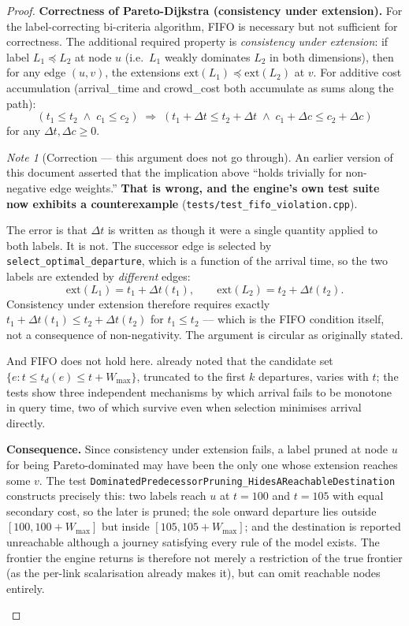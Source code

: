 \documentclass[11pt, a4paper]{article}
\theoremstyle{remark}
\newtheorem*{note}{Note}
\newcommand{\wmax}{W_{\max}}
\begin{document}
\begin{proof}
    \textbf{Correctness of Pareto-Dijkstra (consistency under extension).}
    For the label-correcting bi-criteria algorithm, FIFO is necessary but not
    sufficient for correctness. The additional required property is
    \emph{consistency under extension}: if label $L_1 \preceq L_2$ at node $u$
    (i.e.\ $L_1$ weakly dominates $L_2$ in both dimensions), then for any edge
    $(u,v)$, the extensions $\mathrm{ext}(L_1) \preceq \mathrm{ext}(L_2)$ at
    $v$. For additive cost accumulation (arrival\_time and crowd\_cost both
    accumulate as sums along the path):
    \[
        (t_1 \le t_2 \;\wedge\; c_1 \le c_2)
        \;\Rightarrow\;
        (t_1 + \Delta t \le t_2 + \Delta t \;\wedge\; c_1 + \Delta c \le c_2 + \Delta c)
    \]
    for any $\Delta t, \Delta c \ge 0$.

    \begin{note}[Correction --- this argument does not go through]
    \label{note:extension-gap}
    An earlier version of this document asserted that the implication above
    ``holds trivially for non-negative edge weights.'' \textbf{That is wrong, and
    the engine's own test suite now exhibits a counterexample}
    (\texttt{tests/test\_fifo\_violation.cpp}).

    The error is that $\Delta t$ is written as though it were a single quantity
    applied to both labels. It is not. The successor edge is selected by
    \texttt{select\_optimal\_departure}, which is a function of the arrival time,
    so the two labels are extended by \emph{different} edges:
    \[
        \mathrm{ext}(L_1) = t_1 + \Delta t(t_1),
        \qquad
        \mathrm{ext}(L_2) = t_2 + \Delta t(t_2).
    \]
    Consistency under extension therefore requires exactly
    $t_1 + \Delta t(t_1) \le t_2 + \Delta t(t_2)$ for $t_1 \le t_2$ --- which is
    the FIFO condition itself, not a consequence of non-negativity. The argument
    is circular as originally stated.

    And FIFO does not hold here.  already noted
    that the candidate set $\{e : t \le t_d(e) \le t + \wmax\}$, truncated to the
    first $k$ departures, varies with $t$; the tests show three independent
    mechanisms by which arrival fails to be monotone in query time, two of which
    survive even when selection minimises arrival directly.

    \textbf{Consequence.} Since consistency under extension fails, a label pruned
    at node $u$ for being Pareto-dominated may have been the only one whose
    extension reaches some $v$. The test
    \texttt{DominatedPredecessorPruning\_HidesAReachableDestination} constructs
    precisely this: two labels reach $u$ at $t=100$ and $t=105$ with equal
    secondary cost, so the later is pruned; the sole onward departure lies outside
    $[100, 100+\wmax]$ but inside $[105, 105+\wmax]$; and the destination is
    reported unreachable although a journey satisfying every rule of the model
    exists. The frontier the engine returns is therefore not merely a restriction
    of the true frontier (as the per-link scalarisation already makes it), but can
    omit reachable nodes entirely.


\end{note}
\end{proof}
\end{document}
